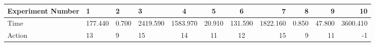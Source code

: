 \documentclass[8pt]{article}
\begin{document}
\begin{landscape}
\begin{tabular}{ | l | l | l | l | c | c | c | r | r | r | r | }
 \hline 
Experiment Number & 1 & 2 & 3 & 4 & 5 & 6 & 7 & 8 & 9 & 10\\ \hline
Time & 177.440 & 0.700 & 2419.590 & 1583.970 & 20.910 & 131.590 & 1822.160 & 0.850 & 47.800 & 3600.410\\ \hline
Action & 13 & 9 & 15 & 14 & 11 & 12 & 15 & 9 & 11 & -1\\ \hline\end{tabular}
\end{landscape}
\end{document}
